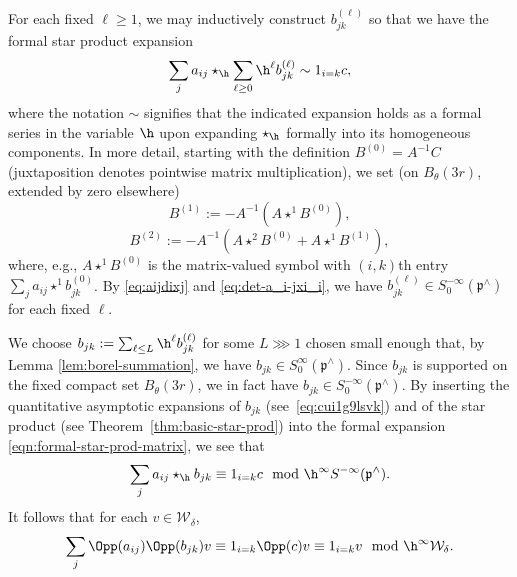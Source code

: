 For each fixed $\ell \geq 1$, we may inductively construct $b_{jk}^{(\ell)}$ so that we have the formal star product expansion
\begin{equation}\label{eqn:formal-star-prod-matrix}
  \sum_j a_{i j} \star_{\h} \sum_{\ell \geq 0} \h^{\ell} b_{j k}^{(\ell)} \sim  1_{i=k} c,
\end{equation}
where the notation $\sim$ signifies that the indicated expansion holds as a formal series in the variable $\h$ upon expanding $\star_{\h}$ formally into its homogeneous components.  In more detail, starting with the definition $B^{(0)} = A^{-1} C$ (juxtaposition denotes pointwise matrix multiplication), we set (on $B_\theta(3 r)$, extended by zero elsewhere)
\[
  B^{(1)} := - A^{-1} (A \star^1 B^{(0)}),
\]
\[
  B^{(2)} := -A^{-1} ( A \star^2 B^{(0)} + A \star^1 B^{(1)}),
\]
where, e.g., $A \star^1 B^{(0)}$ is the matrix-valued symbol with $(i,k)$th entry $\sum_j a_{i j} \star^1 b_{j k}^{(0)}$.  By \eqref{eq:aijdixj} and \eqref{eq:det-a_i-jxi_i}, we have $b_{j k}^{(\ell)} \in S^{-\infty}_0(\mathfrak{p}^\wedge)$ for each fixed $\ell$. %

We choose $b_{jk} := \sum_{\ell \leq L} \h^{\ell} b_{j k}^{(\ell)}$ for some $L \ggg 1$ chosen small enough that, by Lemma \ref{lem:borel-summation}, we have $b_{j k} \in S^{\infty}_0(\mathfrak{p}^\wedge)$.  Since $b_{j k}$ is supported on the fixed compact set $B_\theta(3 r)$, we in fact have $b_{j k} \in S_0^{- \infty}(\mathfrak{p}^\wedge)$.  By inserting the quantitative asymptotic expansions of $b_{j k}$ (see~\eqref{eq:cui1g9lsvk}) and of the star product (see Theorem~\ref{thm:basic-star-prod}) into the formal expansion \eqref{eqn:formal-star-prod-matrix}, we see that
\begin{equation*}
  \sum_j a_{i j} \star_{\h} b_{j k}
  \equiv 1_{i = k} c \mod{\h^\infty S^{-\infty}(\mathfrak{p}^\wedge)}.
\end{equation*}
It follows that for each $v \in \mathcal{W}_\delta$,
\begin{equation}\label{eqn:approx-invert-operators-aij-bjk}
  \sum_j \Opp(a_{i j})
  \Opp(b_{j k})
  v
  \equiv
  1_{i = k} \Opp(c) v
  \equiv 1_{i = k} v
  \mod{\h^\infty \mathcal{W}_\delta}.
\end{equation}

